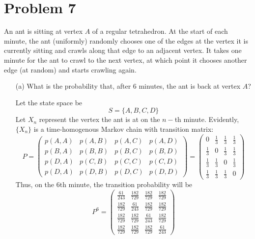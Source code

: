 \documentclass[11pt]{article}
\begin{document}
\section*{Problem 7}
\begin{problem}
    An ant is sitting at vertex \( A \) of a regular tetrahedron. At the start of each minute, the ant (uniformly) randomly chooses one of the edges at the vertex it is currently sitting and crawls along that edge to an adjacent vertex. It takes one minute for the ant to crawl to the next vertex, at which point it chooses another edge (at random) and starts crawling again.

\begin{enumerate}
    \item[(a)] What is the probability that, after 6 minutes, the ant is back at vertex \( A \)?
    \begin{solution}
        Let the state space be 
        \[S  = \{A, B, C, D\}\]
        Let $X_n$ represent the vertex the ant is at on the $n-$th minute. Evidently, $\{X_n\}$ is a time-homogenous Markov chain with transition matrix:
        \[P = \begin{pmatrix}
            p(A,A) & p(A, B) & p(A, C) & p(A, D)\\
            p(B,A) & p(B, B) & p(B, C) & p(B, D)\\
            p(D,A) & p(C, B) & p(C, C) & p(C, D)\\
            p(D,A) & p(D, B) & p(D, C) & p(D, D)
        \end{pmatrix} = \begin{pmatrix}
            0 & \frac{1}{3} & \frac{1}{3} & \frac{1}{3}\\
            \frac{1}{3} & 0 & \frac{1}{3} & \frac{1}{3}\\
            \frac{1}{3} & \frac{1}{3} & 0 & \frac{1}{3}\\
            \frac{1}{3} & \frac{1}{3} & \frac{1}{3} & 0
        \end{pmatrix}\] Thus, on the $6$th minute, the transition probability will be 
        \[P^6  = \begin{pmatrix}
\frac{61}{243} & \frac{182}{729} & \frac{182}{729} & \frac{182}{729} \\
\frac{182}{729} & \frac{61}{243} & \frac{182}{729} & \frac{182}{729} \\
\frac{182}{729} & \frac{182}{729} & \frac{61}{243} & \frac{182}{729} \\
\frac{182}{729} & \frac{182}{729} & \frac{182}{729} & \frac{61}{243}
\end{pmatrix}
\]
\end{solution}
\end{enumerate}
\end{problem}
\end{document}
